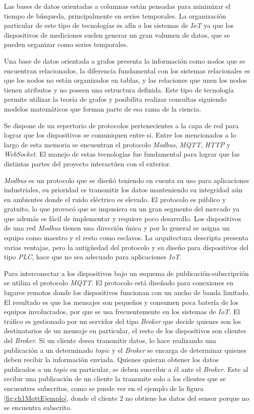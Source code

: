Las bases de datos orientadas a columnas están pensadas para minimizar el tiempo de búsqueda, principalmente en series temporales.
La organización particular de este tipo de tecnologías es afín a los sistemas de \emph{IoT} ya que los dispositivos de mediciones suelen generar un gran volumen de datos, que se pueden organizar como series temporales.

Una base de datos orientada a grafos presenta la información como nodos que se encuentran relacionados, la diferencia fundamental con los sistemas relacionales es que los nodos no están organizados en tablas, y las relaciones que unen los nodos tienen atributos y no poseen una estructura definida.
Este tipo de tecnología permite utilizar la teoría de grafos y posibilita realizar consultas siguiendo modelos matemáticos que forman parte de esa rama de la ciencia.

Se dispone de un repertorio de protocolos pertenecientes a la capa de red para lograr que los dispositivos se comuniquen entre si.
Entre los mencionados a lo largo de esta memoria se encuentran el protocolo \emph{Modbus}, \emph{MQTT}, \emph{HTTP} y \emph{WebSocket}. El manejo de estas tecnologías fue fundamental para lograr que las distintas partes del proyecto interactúen con el exterior.

\emph{Modbus} es un protocolo que se diseñó teniendo en cuenta su uso para aplicaciones industriales, su prioridad es transmitir los datos manteniendo su integridad aún en ambientes donde el ruido eléctrico es elevado. El protocolo es público y gratuito, lo que provocó que se impusiera en un gran segmento del mercado ya que además es fácil de implementar y requiere poco desarrollo. Los dispositivos de una red \emph{Modbus} tienen una dirección única y por lo general se asigna un equipo como maestro y el resto como esclavos. La arquitectura descripta presenta varias ventajas, pero la antigüedad del protocolo y su diseño para dispositivos del tipo \emph{PLC}, hace que no sea adecuado para aplicaciones \emph{IoT}.

Para interconectar a los dispositivos bajo un esquema de publicación-subscripción se utiliza el protocolo \emph{MQTT}. El protocolo está diseñado para conexiones en lugares remotos donde los dispositivos funcionan con un ancho de banda limitado.
El resultado es que los mensajes son pequeños y consumen poca batería de los equipos involucrados, por que se usa frecuentemente en los sistemas de \emph{IoT}. El tráfico es gestionado por un servidor del tipo \emph{Broker} que decide quienes son los destinatarios de un mensaje en particular, el resto de los dispositivos son clientes del \emph{Broker}.
Si un cliente desea transmitir datos, lo hace realizando una publicación a un determinado \emph{topic} y el \emph{Broker} se encarga de determinar quienes deben recibir la información enviada.
Quienes quieran obtener los datos publicados a un \emph{topic} en particular, se deben suscribir a él ante el \emph{Broker}.
Este al recibir una publicación de un cliente la transmite solo a los clientes que se encuentres subscritos, como se puede ver en el ejemplo de la figura \ref{fig:ch1MqttEjemplo}, donde el cliente 2 no obtiene los datos del sensor porque no se encuentra subscrito.

